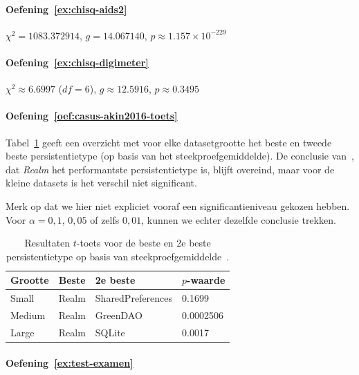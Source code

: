 \paragraph{Oefening~\ref{ex:chisq-aids2}} $\chi^2 = 1083.372914$, $g = 14.067140$, $p \approx 1.157 \times 10^{-229}$

\paragraph{Oefening~\ref{ex:chisq-digimeter}} $\chi^2 \approx 6.6997$ ($df = 6$), $g \approx 12.5916$, $p \approx 0.3495$


\paragraph{Oefening~\ref{oef:casus-akin2016-toets}}

Tabel~\ref{tab:akin2016-resultaten-ttoets} geeft een overzicht met voor elke datasetgrootte het beste en tweede beste persistentietype (op basis van het steekproefgemiddelde). De conclusie van~\textcite{Akin2016}, dat \emph{Realm} het performantste persistentietype is, blijft overeind, maar voor de kleine datasets is het verschil niet significant.

Merk op dat we hier niet expliciet vooraf een significantieniveau gekozen hebben. Voor $\alpha = 0,1$, $0,05$ of zelfs $0,01$, kunnen we echter dezelfde conclusie trekken.

\begin{table}
  \begin{center}
    \begin{tabular}{llll}
      \toprule
      \textbf{Grootte} & \textbf{Beste} & \textbf{2e beste} & \textbf{$p$-waarde} \\ \midrule
      Small            & Realm          & SharedPreferences & 0.1699     \\
      Medium           & Realm          & GreenDAO          & 0.0002506  \\
      Large            & Realm          & SQLite            & 0.0017     \\ \bottomrule
    \end{tabular}
  \end{center}
  \caption{Resultaten $t$-toets voor de beste en 2e beste persistentietype op basis van steekproefgemiddelde~\autocite{Akin2016}.}
  \label{tab:akin2016-resultaten-ttoets}
\end{table}

\paragraph{Oefening~\ref{ex:test-examen}}

